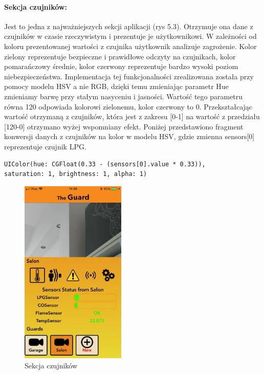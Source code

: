 \paragraph{Sekcja czujników:}
Jest to jedna z najważniejszych sekcji aplikacji (rys 5.3).  Otrzymuje ona dane z czujników w czasie rzeczywistym i prezentuje je użytkownikowi.  W zależności od koloru prezentowanej wartości z czujnika użytkownik analizuje zagrożenie. Kolor zielony reprezentuje bezpieczne i prawidłowe odczyty na czujnikach, kolor pomarańczowy średnie, kolor czerwony reprezentuje bardzo wysoki poziom niebezpieczeństwa. Implementacja tej funkcjonalności zrealizowana została przy pomocy modelu HSV a nie RGB, dzięki temu zmieniając parametr Hue zmieniamy barwę przy stałym nasyceniu i jasności. Wartość tego parametru równa 120\textdegree{} odpowiada kolorowi zielonemu, kolor czerwony to 0\textdegree{}. Przekształcając wartość otrzymaną z czujników, która jest z zakresu [0-1] na wartość z przedziału [120-0] otrzymano wyżej wspomniany efekt. 
Poniżej przedstawiono fragment konwersji danych z czujników na kolor w modelu HSV, gdzie zmienna sensors[0] reprezentuje czujnik LPG.
\begin{verbatim}
UIColor(hue: CGFloat(0.33 - (sensors[0].value * 0.33)),
saturation: 1, brightness: 1, alpha: 1)
\end{verbatim}
\begin{figure}[h]
	\centering
	\includegraphics[width=5cm]{sensors.png}
	\caption{Sekcja czujników}
\end{figure}

